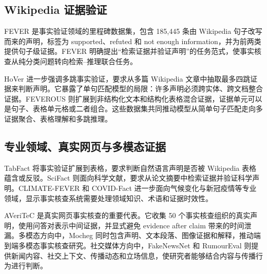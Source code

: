 \documentclass[UTF8,a4paper,zihao=5,twocolumn]{ctexart}
\begin{document}
\subsection{Wikipedia 证据验证}

FEVER 是事实验证领域的里程碑数据集，包含 185,445 条由 Wikipedia 句子改写而来的声明，标签为 supported、refuted 和 not enough information，并为前两类提供句子级证据\cite{Thorne2018FEVER}。FEVER 明确提出“检索证据并验证声明”的任务范式，使事实核查从纯分类问题转向检索--推理联合任务。

HoVer 进一步强调多跳事实验证，要求从多篇 Wikipedia 文章中抽取最多四跳证据来判断声明\cite{Jiang2020HoVer}。它暴露了单句匹配模型的局限：许多声明必须跨实体、跨文档整合证据。FEVEROUS 则扩展到非结构化文本和结构化表格混合证据，证据单元可以是句子、表格单元格或二者组合\cite{Aly2021FEVEROUS}。这些数据集共同推动模型从简单句子匹配走向多证据聚合、表格理解和多跳推理。

\subsection{专业领域、真实网页与多模态证据}

TabFact 将事实验证扩展到表格，要求判断自然语言声明是否被 Wikipedia 表格蕴含或反驳\cite{Chen2019TabFact}。SciFact 则面向科学文献，要求从论文摘要中检索证据并验证科学声明\cite{Wadden2020SciFact}。CLIMATE-FEVER 和 COVID-Fact 进一步面向气候变化与新冠疫情等专业领域，显示事实核查系统需要处理领域知识、术语和证据时效性\cite{Diggelmann2020ClimateFever,Saakyan2021COVIDFact}。

AVeriTeC 是真实网页事实核查的重要代表。它收集 50 个事实核查组织的真实声明，使用问答对表示中间证据，并显式避免 evidence after claim 带来的时间泄漏\cite{Schlichtkrull2023AVeriTeC}。多模态方向中，Mocheg 同时包含声明、文本段落、图像证据和解释，推动端到端多模态事实核查研究\cite{Yao2022Mocheg}。社交媒体方向中，FakeNewsNet 和 RumourEval 则提供新闻内容、社交上下文、传播动态和立场信息，使研究者能够结合内容与传播行为进行判断\cite{Shu2018FakeNewsNet,Gorrell2018RumourEval}。
\end{document}
